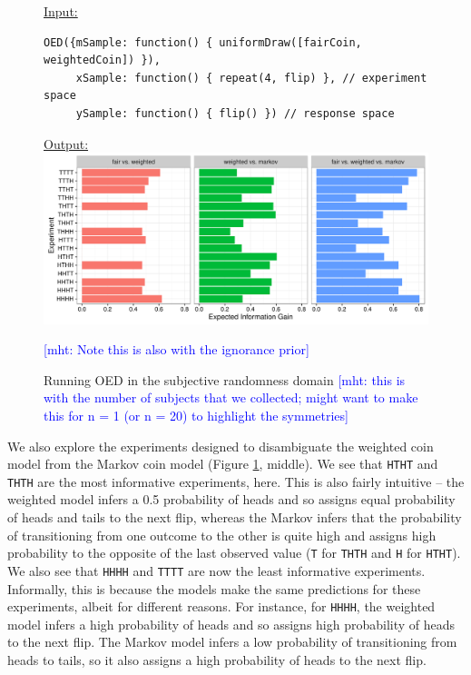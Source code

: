 \documentclass{article}
\newcommand{\mht}[1]{\textcolor{Blue}{[mht: #1]}}
\newcommand{\lou}[1]{\textcolor{orange}{[lou: #1]}}
\begin{document}
\begin{figure}[h]
\underline{\textsf{Input:}}
\begin{lstlisting}
OED({mSample: function() { uniformDraw([fairCoin, weightedCoin]) }),
     xSample: function() { repeat(4, flip) }, // experiment space
     ySample: function() { flip() }) // response space
\end{lstlisting}

\underline{\textsf{Output:}}\\
\includegraphics[width=\columnwidth]{img/coin_eig.pdf}
\caption{Running OED in the subjective randomness domain \mht{this is with the number of subjects that we collected; might want to make this for n = 1 (or n = 20) to highlight the symmetries}} \mht{Note this is also with the ignorance prior}
\label{fig:run-coin}
\end{figure}

We also explore the experiments designed to disambiguate the weighted coin model from the Markov coin model (Figure \ref{fig:run-coin}, middle).
We see that \lstinline{HTHT} and \lstinline{THTH} are the most informative experiments, here.
This is also fairly intuitive -- the weighted model infers a 0.5 probability of heads and so assigns equal probability of heads and tails to the next flip, whereas the Markov infers that the probability of transitioning from one outcome to the other is quite high and assigns high probability to the opposite of the last observed value (\lstinline{T} for \lstinline{THTH} and \lstinline{H} for \lstinline{HTHT}).
We also see that \lstinline{HHHH} and \lstinline{TTTT} are now the least informative experiments.
Informally, this is because the models make the same predictions for these experiments, albeit for different reasons.
For instance, for \lstinline{HHHH}, the weighted model infers a high probability of heads and so assigns high probability of heads to the next flip.
The Markov model infers a low probability of transitioning from heads to tails, so it also assigns a high probability of heads to the next flip.
\end{document}
